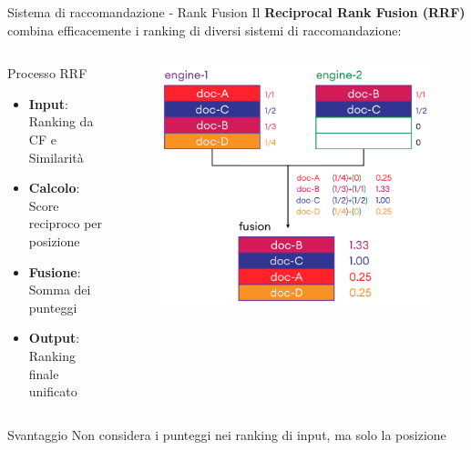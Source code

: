 \documentclass{beamer}
\begin{document}
	\begin{frame}{Sistema di raccomandazione - Rank Fusion}
		Il \textbf{Reciprocal Rank Fusion (RRF)} combina efficacemente i ranking di diversi sistemi di raccomandazione:

		\begin{columns}
			\begin{column}{0.6\textwidth}
				\begin{block}{Processo RRF}
					\begin{itemize}
						\item \textbf{Input}: Ranking da CF e Similarità
						\item \textbf{Calcolo}: Score reciproco per posizione
						\item \textbf{Fusione}: Somma dei punteggi
						\item \textbf{Output}: Ranking finale unificato
					\end{itemize}
				\end{block}
			\end{column}
			\begin{column}{0.4\textwidth}
				\begin{figure}
					\centering
					\includegraphics[width=\textwidth]{Reciprocal-Rank-Fusion.png}
				\end{figure}
			\end{column}
		\end{columns}

		\begin{alertblock}{Svantaggio}
			Non considera i punteggi nei ranking di input, ma solo la posizione
		\end{alertblock}
	\end{frame}
\end{document}
